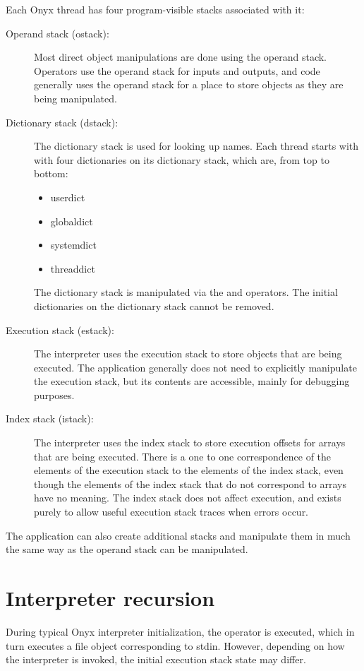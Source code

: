 Each Onyx thread has four program-visible stacks associated with it:
\begin{description}
\item[Operand stack (ostack): ] Most direct object manipulations are done using
	the operand stack.  Operators use the operand stack for inputs and
	outputs, and code generally uses the operand stack for a place to store
	objects as they are being manipulated.
\item[Dictionary stack (dstack): ] The dictionary stack is used for looking up
	names.  Each thread starts with with four dictionaries on its dictionary
	stack, which are, from top to bottom:
	\begin{itemize}
		\item{userdict}
		\item{globaldict}
		\item{systemdict}
		\item{threaddict}
	\end{itemize}
	The dictionary stack is manipulated via the
	 and
	 operators.  The initial
	dictionaries on the dictionary stack cannot be removed.
\item[Execution stack (estack): ] The interpreter uses the execution stack to
	store objects that are being executed.  The application generally does
	not need to explicitly manipulate the execution stack, but its contents
	are accessible, mainly for debugging purposes.
\item[Index stack (istack): ] The interpreter uses the index stack to store
	execution offsets for arrays that are being executed.  There is a one to
	one correspondence of the elements of the execution stack to the
	elements of the index stack, even though the elements of the index stack
	that do not correspond to arrays have no meaning.  The index stack does
	not affect execution, and exists purely to allow useful execution stack
	traces when errors occur.
\end{description}

The application can also create additional stacks and manipulate them in much
the same way as the operand stack can be manipulated.

\section{Interpreter recursion}

During typical Onyx interpreter initialization, the
 operator is executed, which in
turn executes a file object corresponding to stdin.  However, depending on how
the interpreter is invoked, the initial execution stack state may differ.

